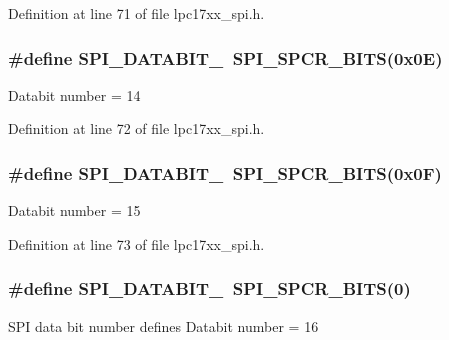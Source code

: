 \-Definition at line 71 of file lpc17xx\-\_\-spi.\-h.

\hypertarget{group___s_p_i___public___macros_ga6aa449c32fa6f102955b7d09241df9eb}{
\subsubsection[{\-S\-P\-I\-\_\-\-D\-A\-T\-A\-B\-I\-T\-\_\-14}]{\setlength{\rightskip}{0pt plus 5cm}\#define {\bf \-S\-P\-I\-\_\-\-D\-A\-T\-A\-B\-I\-T\-\_}~{\bf \-S\-P\-I\-\_\-\-S\-P\-C\-R\-\_\-\-B\-I\-T\-S}(0x0\-E)}}\label{group___s_p_i___public___macros_ga6aa449c32fa6f102955b7d09241df9eb}
\-Databit number = 14 

\-Definition at line 72 of file lpc17xx\-\_\-spi.\-h.

\hypertarget{group___s_p_i___public___macros_gaf10914e97aeeda113d8e7947cf6b942e}{
\subsubsection[{\-S\-P\-I\-\_\-\-D\-A\-T\-A\-B\-I\-T\-\_\-15}]{\setlength{\rightskip}{0pt plus 5cm}\#define {\bf \-S\-P\-I\-\_\-\-D\-A\-T\-A\-B\-I\-T\-\_}~{\bf \-S\-P\-I\-\_\-\-S\-P\-C\-R\-\_\-\-B\-I\-T\-S}(0x0\-F)}}\label{group___s_p_i___public___macros_gaf10914e97aeeda113d8e7947cf6b942e}
\-Databit number = 15 

\-Definition at line 73 of file lpc17xx\-\_\-spi.\-h.

\hypertarget{group___s_p_i___public___macros_ga5897125c1aaf822b7d3a0e79baa564d2}{
\subsubsection[{\-S\-P\-I\-\_\-\-D\-A\-T\-A\-B\-I\-T\-\_\-16}]{\setlength{\rightskip}{0pt plus 5cm}\#define {\bf \-S\-P\-I\-\_\-\-D\-A\-T\-A\-B\-I\-T\-\_}~{\bf \-S\-P\-I\-\_\-\-S\-P\-C\-R\-\_\-\-B\-I\-T\-S}(0)}}\label{group___s_p_i___public___macros_ga5897125c1aaf822b7d3a0e79baa564d2}
\-S\-P\-I data bit number defines \-Databit number = 16 

